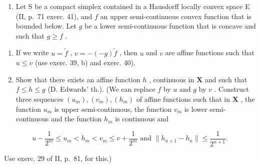 \begin{enumerate}
\def\labelenumi{\arabic{enumi})}
\setcounter{enumi}{40}
\tightlist
\item
  Let S be a compact simplex contained in a Hausdorff locally convex space E (II, p.~71 exerc. 41), and \(f\) an upper semi-continuous convex function that is bounded below. Let \(g\) be a lower semi-continuous function that is concave and such that \(g \geqslant f\) .
\end{enumerate}

\begin{enumerate}
\def\labelenumi{\alph{enumi})}
\item
  If we write \(u = \tilde{f}\) , \(v = -(-g)\tilde{f}\) , then \(u\) and \(v\) are affine functions such that \(u \leqslant v\) (use exerc. 39, b) and exerc. 40).
\item
  Show that there exists an affine function \(h\) , continuous in \(\mathbf{X}\) and such that \(f \leqslant h \leqslant g\) (D. Edwards' th.). (We can replace \(f\) by \(u\) and \(g\) by \(v\) . Construct three sequences \((u_m), (v_m), (h_m)\) of affine functions such that in \(\mathbf{X}\) , the function \(u_m\) is upper semi-continuous, the function \(v_m\) is lower semi-continuous and the function \(h_m\) is continuous and
\end{enumerate}

\[
u - \frac {1}{2 ^ {m}} \leqslant u _ {m} <   h _ {m} <   v _ {m} \leqslant v + \frac {1}{2 ^ {m}} \text { and } \| h _ {n + 1} - h _ {n} \| \leqslant \frac {1}{2 ^ {n + 1}}.
\]

Use exerc. 29 of II, p.~81, for this.)

